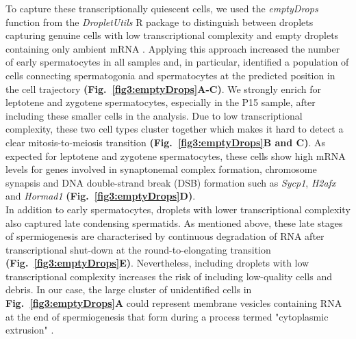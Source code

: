 To capture these transcriptionally quiescent cells, we used the \emph{emptyDrops} function from the \emph{DropletUtils} R package to distinguish between droplets capturing genuine cells with low transcriptional complexity and empty droplets containing only ambient mRNA \citep{Lun2018}. Applying this approach increased the number of early spermatocytes in all samples and, in particular, identified a population of cells connecting spermatogonia and spermatocytes at the predicted position in the cell trajectory \textbf{(Fig.~\ref{fig3:emptyDrops}A-C)}. We strongly enrich for leptotene and zygotene spermatocytes, especially in the P15 sample, after including these smaller cells in the analysis. Due to low transcriptional complexity, these two cell types cluster together which makes it hard to detect a clear mitosis-to-meiosis transition \textbf{(Fig.~\ref{fig3:emptyDrops}B and C)}. As expected for leptotene and zygotene spermatocytes, these cells show high mRNA levels for genes involved in synaptonemal complex formation, chromosome synapsis and DNA double-strand break (DSB) formation such as \textit{Sycp1}, \textit{H2afx} and \textit{Hormad1} \citep{Daniel2011, Mahadevaiah2001, Vries2005} \textbf{(Fig.~\ref{fig3:emptyDrops}D)}.\\

In addition to early spermatocytes, droplets with lower transcriptional complexity also captured late condensing spermatids. As mentioned above, these late stages of spermiogenesis are characterised by continuous degradation of RNA after transcriptional shut-down at the round-to-elongating transition \citep{Steger1999} \textbf{(Fig.~\ref{fig3:emptyDrops}E)}. Nevertheless, including droplets with low transcriptional complexity increases the risk of including low-quality cells and debris. In our case, the large cluster of unidentified cells in \textbf{Fig.~\ref{fig3:emptyDrops}A} could represent membrane vesicles containing RNA at the end of spermiogenesis that form during a process termed "cytoplasmic extrusion" \citep{Rengan2012}.\\

\newpage


